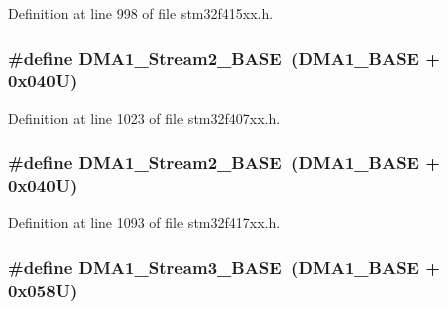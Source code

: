 Definition at line 998 of file stm32f415xx.\+h.

\subsubsection[{\texorpdfstring{D\+M\+A1\+\_\+\+Stream2\+\_\+\+B\+A\+SE}{DMA1_Stream2_BASE}}]{\setlength{\rightskip}{0pt plus 5cm}\#define D\+M\+A1\+\_\+\+Stream2\+\_\+\+B\+A\+SE~({\bf D\+M\+A1\+\_\+\+B\+A\+SE} + 0x040\+U)}\hypertarget{group___peripheral__registers__structures_ga48a551ee91d3f07dd74347fdb35c703d}{}\label{group___peripheral__registers__structures_ga48a551ee91d3f07dd74347fdb35c703d}


Definition at line 1023 of file stm32f407xx.\+h.

\subsubsection[{\texorpdfstring{D\+M\+A1\+\_\+\+Stream2\+\_\+\+B\+A\+SE}{DMA1_Stream2_BASE}}]{\setlength{\rightskip}{0pt plus 5cm}\#define D\+M\+A1\+\_\+\+Stream2\+\_\+\+B\+A\+SE~({\bf D\+M\+A1\+\_\+\+B\+A\+SE} + 0x040\+U)}\hypertarget{group___peripheral__registers__structures_ga48a551ee91d3f07dd74347fdb35c703d}{}\label{group___peripheral__registers__structures_ga48a551ee91d3f07dd74347fdb35c703d}


Definition at line 1093 of file stm32f417xx.\+h.

\subsubsection[{\texorpdfstring{D\+M\+A1\+\_\+\+Stream3\+\_\+\+B\+A\+SE}{DMA1_Stream3_BASE}}]{\setlength{\rightskip}{0pt plus 5cm}\#define D\+M\+A1\+\_\+\+Stream3\+\_\+\+B\+A\+SE~({\bf D\+M\+A1\+\_\+\+B\+A\+SE} + 0x058\+U)}\hypertarget{group___peripheral__registers__structures_gac51deb54ff7cfe1290dfcf517ae67127}{}\label{group___peripheral__registers__structures_gac51deb54ff7cfe1290dfcf517ae67127}


